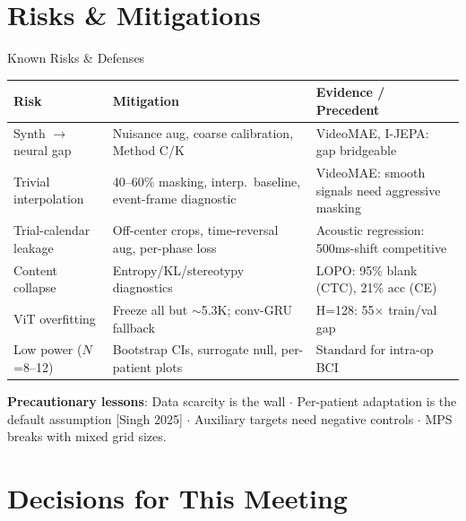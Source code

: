 \documentclass[aspectratio=169, 11pt]{beamer}
\newcommand{\emphcite}[1]{\textcolor{DukeBlue!70}{\footnotesize [#1]}}
\begin{document}
\section{Risks \& Mitigations}

\begin{frame}{Known Risks \& Defenses}

\footnotesize
\renewcommand{\arraystretch}{1.15}
\begin{tabular}{@{}L{3.0cm} L{5.2cm} L{4.5cm}@{}}
  \toprule
  \textbf{Risk} & \textbf{Mitigation} & \textbf{Evidence / Precedent} \\
  \midrule
  Synth $\to$ neural gap & Nuisance aug, coarse calibration, Method C/K & VideoMAE, I-JEPA: gap bridgeable \\
  Trivial interpolation & 40--60\% masking, interp.\ baseline, event-frame diagnostic & VideoMAE: smooth signals need aggressive masking \\
  Trial-calendar leakage & Off-center crops, time-reversal aug, per-phase loss & Acoustic regression: 500ms-shift competitive \\
  Content collapse & Entropy/KL/stereotypy diagnostics & LOPO: 95\% blank (CTC), 21\% acc (CE) \\
  ViT overfitting & Freeze all but $\sim$5.3K; conv-GRU fallback & H=128: 55$\times$ train/val gap \\
  Low power ($N$=8--12) & Bootstrap CIs, surrogate null, per-patient plots & Standard for intra-op BCI \\
  \bottomrule
\end{tabular}

\vspace{0.4em}
\small
\textbf{Precautionary lessons}: Data scarcity is the wall $\cdot$ Per-patient adaptation is the default assumption \emphcite{Singh 2025} $\cdot$ Auxiliary targets need negative controls $\cdot$ MPS breaks with mixed grid sizes.
\end{frame}

\section{Decisions for This Meeting}
\end{document}
